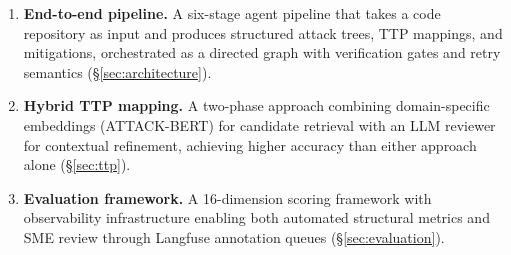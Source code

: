 \begin{enumerate}
    \item \textbf{End-to-end pipeline.} A six-stage agent pipeline that takes a code repository as input and produces structured attack trees, TTP mappings, and mitigations, orchestrated as a directed graph with verification gates and retry semantics (\S\ref{sec:architecture}).

    \item \textbf{Hybrid TTP mapping.} A two-phase approach combining domain-specific embeddings (ATTACK-BERT) for candidate retrieval with an LLM reviewer for contextual refinement, achieving higher accuracy than either approach alone (\S\ref{sec:ttp}).

    \item \textbf{Evaluation framework.} A 16-dimension scoring framework with observability infrastructure enabling both automated structural metrics and SME review through Langfuse annotation queues (\S\ref{sec:evaluation}).
\end{enumerate}
